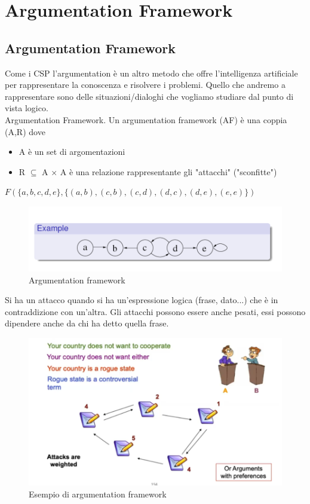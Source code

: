 \chapter{Argumentation Framework} \label{ch:Argumentation Framework}
\section{Argumentation Framework}
Come i CSP l’argumentation è un altro metodo che offre l’intelligenza artificiale per rappresentare la conoscenza e risolvere i problemi. Quello che andremo a rappresentare sono delle situazioni/dialoghi che vogliamo studiare dal punto di vista logico.
\\Argumentation Framework. Un argumentation framework (AF) è una coppia (A,R) dove
\begin{itemize}
    \item A è un set di argomentazioni
    \item R $\subseteq$ A × A è una relazione rappresentante gli "attacchi" ("sconfitte")
\end{itemize}
\begin{center}
    $F(\{a,b,c,d,e\}, \{(a,b),(c,b),(c,d),(d,c),(d,e),(e,e)\})$
\end{center}
\begin{figure}[htp]
	\centering
    \includegraphics[width=12cm, keepaspectratio]{img/Cap6/arg1.png}
    \caption{Argumentation framework}
\end{figure}
Si ha un attacco quando si ha un’espressione logica (frase, dato...) che è in contraddizione con un’altra. Gli attacchi possono essere anche pesati, essi possono dipendere anche da chi ha detto quella frase.
\newpage
\begin{figure}[htp]
	\centering
    \includegraphics[width=12cm, keepaspectratio]{img/Cap6/arg2.png}
    \caption{Esempio di argumentation framework}
\end{figure}
